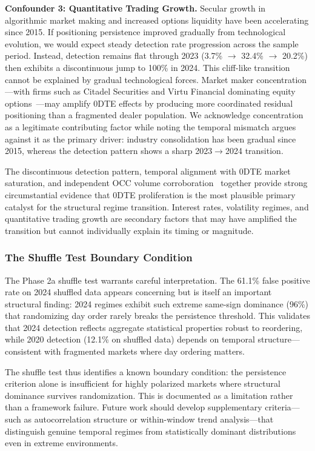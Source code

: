 \textbf{Confounder 3: Quantitative Trading Growth.} Secular growth in algorithmic market making and increased options liquidity have been accelerating since 2015. If positioning persistence improved gradually from technological evolution, we would expect steady detection rate progression across the sample period. Instead, detection remains flat through 2023 (3.7\% $\rightarrow$ 32.4\% $\rightarrow$ 20.2\%) then exhibits a discontinuous jump to 100\% in 2024. This cliff-like transition cannot be explained by gradual technological forces. Market maker concentration---with firms such as Citadel Securities and Virtu Financial dominating equity options~\cite{cboe2024market}---may amplify 0DTE effects by producing more coordinated residual positioning than a fragmented dealer population. We acknowledge concentration as a legitimate contributing factor while noting the temporal mismatch argues against it as the primary driver: industry consolidation has been gradual since 2015, whereas the detection pattern shows a sharp 2023$\rightarrow$2024 transition.

The discontinuous detection pattern, temporal alignment with 0DTE market saturation, and independent OCC volume corroboration~\cite{occ2022record} together provide strong circumstantial evidence that 0DTE proliferation is the most plausible primary catalyst for the structural regime transition. Interest rates, volatility regimes, and quantitative trading growth are secondary factors that may have amplified the transition but cannot individually explain its timing or magnitude.

\subsubsection{The Shuffle Test Boundary Condition}

The Phase 2a shuffle test warrants careful interpretation. The 61.1\% false positive rate on 2024 shuffled data appears concerning but is itself an important structural finding: 2024 regimes exhibit such extreme same-sign dominance (96\%) that randomizing day order rarely breaks the persistence threshold. This validates that 2024 detection reflects aggregate statistical properties robust to reordering, while 2020 detection (12.1\% on shuffled data) depends on temporal structure---consistent with fragmented markets where day ordering matters.

The shuffle test thus identifies a known boundary condition: the persistence criterion alone is insufficient for highly polarized markets where structural dominance survives randomization. This is documented as a limitation rather than a framework failure. Future work should develop supplementary criteria---such as autocorrelation structure or within-window trend analysis---that distinguish genuine temporal regimes from statistically dominant distributions even in extreme environments.

